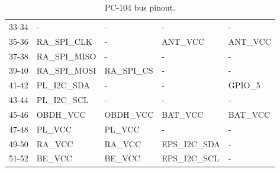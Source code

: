 \begin{table}[!h]
\begin{tabular}{cllll}
        33-34              & -                & -                & -               & -                \\
        35-36              & RA\_SPI\_CLK     & -                & ANT\_VCC        & ANT\_VCC         \\
        37-38              & RA\_SPI\_MISO    & -                & -               & -                \\
        39-40              & RA\_SPI\_MOSI    & RA\_SPI\_CS      & -               & -                \\
        41-42              & PL\_I2C\_SDA     & -                & -               & GPIO\_5          \\
        43-44              & PL\_I2C\_SCL     & -                & -               & -                \\
        45-46              & OBDH\_VCC        & OBDH\_VCC        & BAT\_VCC        & BAT\_VCC         \\
        47-48              & PL\_VCC          & PL\_VCC          & -               & -                \\
        49-50              & RA\_VCC          & RA\_VCC          & EPS\_I2C\_SDA   & -                \\
        51-52              & BE\_VCC          & BE\_VCC          & EPS\_I2C\_SCL   & -                \\
        \bottomrule[1.5pt]
    \end{tabular}
    \caption{PC-104 bus pinout.}
    \label{tab:pc104-pinout}
\end{table}

